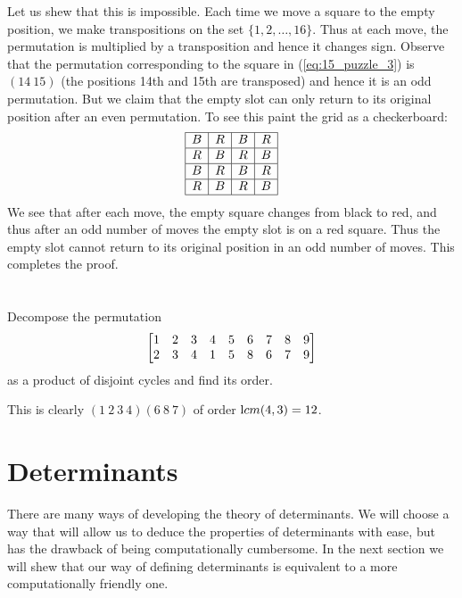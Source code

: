 \begin{solu}Let us shew that this is impossible. Each time we move a
square to the empty position, we make transpositions on the set
$\{1,2,\ldots,16\}$. Thus at each move, the permutation is
multiplied by a transposition and hence it changes sign. Observe
that the permutation corresponding to the square in
(\ref{eq:15_puzzle_3}) is  $(14\ 15)$ (the positions 14th and 15th
are transposed) and hence it is an odd permutation. But we claim
that the empty slot can only return to its original position after
an even permutation. To see this paint the grid as a checkerboard:
\begin{equation}\label{eq:15_puzzle_4}
\begin{array}{|c|c|c|c|} \hline
B & R & B & R\\ \hline R & B & R & B \\ \hline B & R & B & R\\
\hline R & B & R & B \\ \hline
\end{array}
\end{equation}
We see that after each move, the empty square changes from black
to red, and thus after an odd number of moves the empty slot is on
a red square. Thus the empty slot cannot return to its original
position in an odd number of moves. This completes the proof.
\end{solu}
\section*{}

\begin{pro}
Decompose the permutation
$$\begin{bmatrix} 1 & 2 & 3 & 4 & 5 & 6 & 7 & 8 & 9 \cr
2 & 3 & 4 & 1 & 5 & 8 & 6 & 7 & 9 \end{bmatrix}$$as a product of
disjoint cycles and find its order. \begin{answer} This is clearly
$(1\ 2\ 3 \ 4)(6\ 8\ 7) $ of order ${\textrm  lcm} (4, 3) = 12$.
\end{answer}
\end{pro}

\section{Determinants} There are many ways of
developing the theory of determinants. We will choose a way that
will allow us to deduce the properties of determinants with ease,
but has the drawback of being computationally cumbersome. In the
next section we will shew that our way of defining determinants is
equivalent to a more computationally friendly one.
\bigskip

